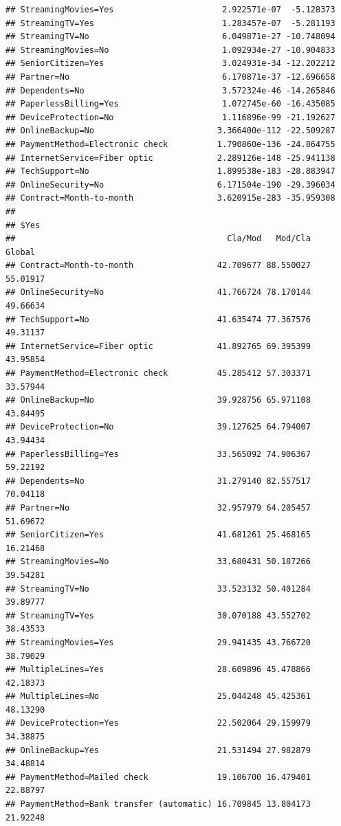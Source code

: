 \documentclass[
]{article}
\begin{document}
\begin{verbatim}
## StreamingMovies=Yes                      2.922571e-07  -5.128373
## StreamingTV=Yes                          1.283457e-07  -5.281193
## StreamingTV=No                           6.049871e-27 -10.748094
## StreamingMovies=No                       1.092934e-27 -10.904833
## SeniorCitizen=Yes                        3.024931e-34 -12.202212
## Partner=No                               6.170871e-37 -12.696658
## Dependents=No                            3.572324e-46 -14.265846
## PaperlessBilling=Yes                     1.072745e-60 -16.435085
## DeviceProtection=No                      1.116896e-99 -21.192627
## OnlineBackup=No                         3.366400e-112 -22.509287
## PaymentMethod=Electronic check          1.790860e-136 -24.864755
## InternetService=Fiber optic             2.289126e-148 -25.941138
## TechSupport=No                          1.899538e-183 -28.883947
## OnlineSecurity=No                       6.171504e-190 -29.396034
## Contract=Month-to-month                 3.620915e-283 -35.959308
## 
## $Yes
##                                           Cla/Mod   Mod/Cla   Global
## Contract=Month-to-month                 42.709677 88.550027 55.01917
## OnlineSecurity=No                       41.766724 78.170144 49.66634
## TechSupport=No                          41.635474 77.367576 49.31137
## InternetService=Fiber optic             41.892765 69.395399 43.95854
## PaymentMethod=Electronic check          45.285412 57.303371 33.57944
## OnlineBackup=No                         39.928756 65.971108 43.84495
## DeviceProtection=No                     39.127625 64.794007 43.94434
## PaperlessBilling=Yes                    33.565092 74.906367 59.22192
## Dependents=No                           31.279140 82.557517 70.04118
## Partner=No                              32.957979 64.205457 51.69672
## SeniorCitizen=Yes                       41.681261 25.468165 16.21468
## StreamingMovies=No                      33.680431 50.187266 39.54281
## StreamingTV=No                          33.523132 50.401284 39.89777
## StreamingTV=Yes                         30.070188 43.552702 38.43533
## StreamingMovies=Yes                     29.941435 43.766720 38.79029
## MultipleLines=Yes                       28.609896 45.478866 42.18373
## MultipleLines=No                        25.044248 45.425361 48.13290
## DeviceProtection=Yes                    22.502064 29.159979 34.38875
## OnlineBackup=Yes                        21.531494 27.982879 34.48814
## PaymentMethod=Mailed check              19.106700 16.479401 22.88797
## PaymentMethod=Bank transfer (automatic) 16.709845 13.804173 21.92248

\end{verbatim}
\end{document}
